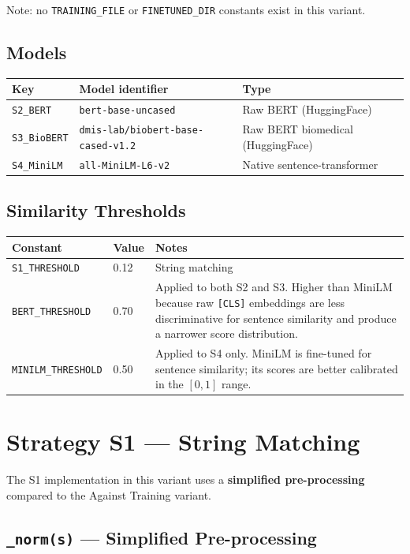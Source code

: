﻿\documentclass[12pt,a4paper]{article}
\begin{document}
Note: no \texttt{TRAINING\_FILE} or \texttt{FINETUNED\_DIR} constants exist in this variant.

\subsection{Models}

\begin{longtable}{@{}P{3.5cm}P{5.5cm}P{6cm}@{}}
\toprule
\textbf{Key} & \textbf{Model identifier} & \textbf{Type} \\
\midrule
\endhead
\texttt{S2\_BERT} & \texttt{bert-base-uncased} & Raw BERT (HuggingFace) \\
\texttt{S3\_BioBERT} & \texttt{dmis-lab/biobert-base-cased-v1.2} & Raw BERT biomedical (HuggingFace) \\
\texttt{S4\_MiniLM} & \texttt{all-MiniLM-L6-v2} & Native sentence-transformer \\
\bottomrule
\end{longtable}

\subsection{Similarity Thresholds}

\begin{longtable}{@{}P{4.5cm}P{3cm}P{7cm}@{}}
\toprule
\textbf{Constant} & \textbf{Value} & \textbf{Notes} \\
\midrule
\endhead
\texttt{S1\_THRESHOLD} & 0.12 & String matching \\
\texttt{BERT\_THRESHOLD} & 0.70 &
  Applied to both S2 and S3. Higher than MiniLM because raw \texttt{[CLS]}
  embeddings are less discriminative for sentence similarity and produce
  a narrower score distribution. \\
\texttt{MINILM\_THRESHOLD} & 0.50 &
  Applied to S4 only. MiniLM is fine-tuned for sentence similarity;
  its scores are better calibrated in the $[0,1]$ range. \\
\bottomrule
\end{longtable}

\clearpage
\section{Strategy S1 --- String Matching}

The S1 implementation in this variant uses a \textbf{simplified pre-processing} compared to the Against Training variant.

\subsection{\texttt{\_norm(s)} --- Simplified Pre-processing}
\end{document}
